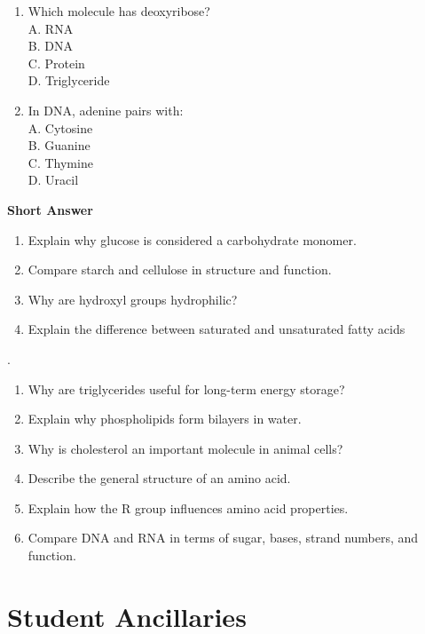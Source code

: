\documentclass[
  letterpaper,
  DIV=11,
  numbers=noendperiod]{scrreprt}
\begin{document}
\begin{enumerate}
  A. Glycosidic linkage\\
  B. Peptide bond\\
  C. Phosphodiester bond\\
  D. Disulfide only
\item
  Which molecule has deoxyribose?\\
  A. RNA\\
  B. DNA\\
  C. Protein\\
  D. Triglyceride
\item
  In DNA, adenine pairs with:\\
  A. Cytosine\\
  B. Guanine\\
  C. Thymine\\
  D. Uracil
\end{enumerate}

\textbf{Short Answer}

\begin{enumerate}
\def\labelenumi{\arabic{enumi}.}
\setcounter{enumi}{10}
\item
  Explain why glucose is considered a carbohydrate monomer.
\item
  Compare starch and cellulose in structure and function.
\item
  Why are hydroxyl groups hydrophilic?
\item
  Explain the difference between saturated and unsaturated fatty acids
\end{enumerate}

.

\begin{enumerate}
\def\labelenumi{\arabic{enumi}.}
\setcounter{enumi}{14}
\item
  Why are triglycerides useful for long-term energy storage?
\item
  Explain why phospholipids form bilayers in water.
\item
  Why is cholesterol an important molecule in animal cells?
\item
  Describe the general structure of an amino acid.
\item
  Explain how the R group influences amino acid properties.
\item
  Compare DNA and RNA in terms of sugar, bases, strand numbers, and
  function.
\end{enumerate}

\textbf{\hfill\break
}

\section{\texorpdfstring{\textbf{Student
Ancillaries}}{Student Ancillaries}}\label{student-ancillaries}
\end{document}
